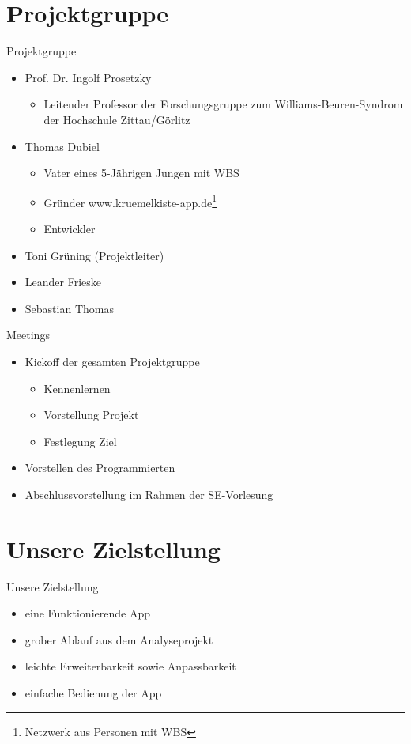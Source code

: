 \documentclass[10pt,fleqn]{beamer}
\begin{document}
\section{Projektgruppe}
	\begin{frame}[t]{Projektgruppe}
		\begin{itemize}
			\item Prof. Dr. Ingolf Prosetzky
			\begin{itemize}
				\item Leitender Professor der Forschungsgruppe zum Williams-Beuren-Syndrom der Hochschule Zittau/Görlitz
			\end{itemize}
			\item Thomas Dubiel
			\begin{itemize}
				\item Vater eines 5-Jährigen Jungen mit WBS
				\item Gründer www.kruemelkiste-app.de\footnote{Netzwerk aus Personen mit WBS}
				\item Entwickler
			\end{itemize}
			\item Toni Grüning (Projektleiter)
			\item Leander Frieske
			\item Sebastian Thomas
		\end{itemize}
	\end{frame}

	\begin{frame}[t]{Meetings}
		\begin{itemize}
			\item Kickoff der gesamten Projektgruppe
			\begin{itemize}
				\item Kennenlernen
				\item Vorstellung Projekt
				\item Festlegung Ziel
			\end{itemize}
			\item Vorstellen des Programmierten
			\item Abschlussvorstellung im Rahmen der SE-Vorlesung 
		\end{itemize}
	\end{frame}



\section{Unsere Zielstellung}
\begin{frame}[t]{Unsere Zielstellung}
	\begin{itemize}
		\item eine Funktionierende App
		\item grober Ablauf aus dem Analyseprojekt
		\item leichte Erweiterbarkeit sowie Anpassbarkeit
		\item einfache Bedienung der App
	\end{itemize}
\end{frame}
\end{document}
